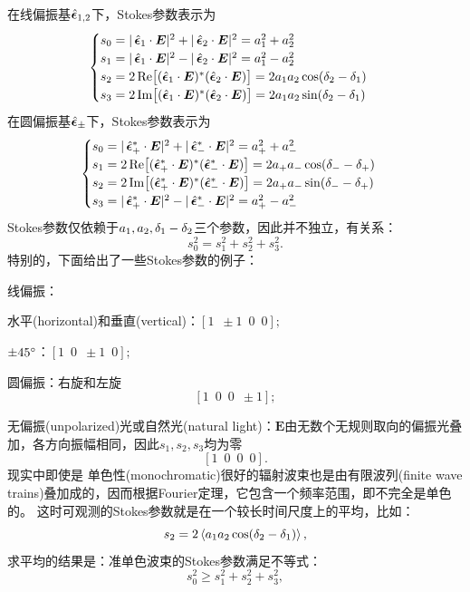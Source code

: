 在线偏振基$\mathop{}\!\hat{\bm \epsilon}_{1,2}$下，Stokes参数表示为
\begin{equation}
    \begin{cases}
        s_0=|\uvec\epsilon_1\cdot\bm E|^2+|\uvec\epsilon_2\cdot\bm E|^2=a_1^2+a_2^2\\
        s_1=|\uvec\epsilon_1\cdot\bm E|^2-|\uvec\epsilon_2\cdot\bm E|^2=a_1^2-a_2^2\\
        s_2=2\Re\bigfkh{(\uvec\epsilon_1\cdot\bm E)\cj(\uvec\epsilon_2\cdot\bm E)}=2a_1a_2\cos(\vd_2-\vd_1)\\
        s_3=2\Im\bigfkh{(\uvec\epsilon_1\cdot\bm E)\cj(\uvec\epsilon_2\cdot\bm E)}=2a_1a_2\sin(\vd_2-\vd_1)
    \end{cases}
\end{equation}
在圆偏振基$\mathop{}\!\hat{\bm \epsilon}_\pm$下，Stokes参数表示为
\begin{equation}
    \begin{cases}
        s_0=|\uvec\epsilon_+\cj\cdot\bm E|^2+|\uvec\epsilon_-\cj\cdot\bm E|^2=a_+^2+a_-^2\\
        s_1=2\Re\bigfkh{(\uvec\epsilon_+\cj\cdot\bm E)\cj(\uvec\epsilon_-\cj\cdot\bm E)}=2a_+a_-\cos(\vd_--\vd_+)\\
        s_2=2\Im\bigfkh{(\uvec\epsilon_+\cj\cdot\bm E)\cj(\uvec\epsilon_-\cj\cdot\bm E)}=2a_+a_-\sin(\vd_--\vd_+)\\
        s_3=|\uvec\epsilon_+\cj\cdot\bm E|^2-|\uvec\epsilon_-\cj\cdot\bm E|^2=a_+^2-a_-^2
    \end{cases}
\end{equation}
Stokes参数仅依赖于$a_1,a_2,\mathop{}\!\delta_1-\mathop{}\!\delta_2$三个参数，因此并不独立，有关系：
\[
    s_0^2=s_1^2+s_2^2+s_3^2.
\]
特别的，下面给出了一些Stokes参数的例子：
\begin{compactitem}
	\item 线偏振：
    \begin{compactitem}
        \item 水平(horizontal)和垂直(vertical)：$[1\enspace\pm 1\enspace0\enspace0];$
        \item $\pm 45^\circ$：$[1\enspace0\enspace\pm 1\enspace0];$
    \end{compactitem}
	\item 圆偏振：右旋和左旋
	\[
        [1\enspace0\enspace0\enspace\pm 1];
    \]
	\item 无偏振(unpolarized)光或自然光(natural light)：$\bm E$由无数个无规则取向的偏振光叠加，各方向振幅相同，因此$s_1,s_2,s_3$均为零
    \[
        [1\enspace0\enspace0\enspace0].
    \]
    现实中即使是%
    单色性(monochromatic)很好的辐射波束也是由有限波列(finite wave trains)叠加成的，因而根据Fourier定理，它包含一个频率范围，即不完全是单色的。%
    这时可观测的Stokes参数就是在一个较长时间尺度上的平均，比如：
    \[
        s_2=2\left\langle a_1a_2\cos(\mathop{}\!\delta_2-\mathop{}\!\delta_1)\right\rangle,
    \]
    求平均的结果是：准单色波束的Stokes参数满足不等式：
    \[
        s_0^2\geqslant s_1^2+s_2^2+s_3^2,
    \]
\end{compactitem}
